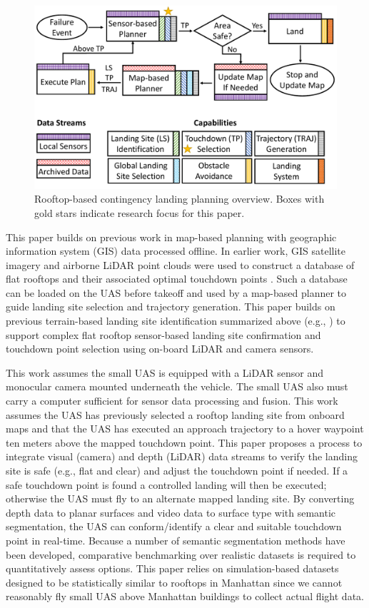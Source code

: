 \begin{figure}[ht!]
\centering
\includegraphics[width=.75\linewidth]{chapter_6_landingsim/figs/problem_statement_overview_2.pdf}
\caption[Rooftop-based contingency landing planning overview]{Rooftop-based contingency landing planning overview. Boxes with gold stars indicate research focus for this paper. }
\label{fig:ch6_contingency_planning}
\end{figure}

This paper builds on previous work in map-based planning with geographic information system (GIS) data processed offline. In earlier work, GIS satellite imagery and airborne LiDAR point clouds were used to construct a database of flat rooftops and their associated optimal touchdown points  \cite{castagno_map-based_2021}. Such a database can be loaded on the UAS before takeoff and used by a map-based planner to guide landing site selection and trajectory generation. This paper builds on previous terrain-based landing site identification summarized above (e.g., \cite{scherer_autonomous_2012}) to support complex flat rooftop sensor-based landing site confirmation and touchdown point selection using on-board LiDAR and camera sensors.

This work assumes the small UAS is equipped with a LiDAR sensor and monocular camera mounted underneath the vehicle. The small UAS also must carry a computer sufficient for sensor data processing and fusion. This work assumes the UAS has previously selected a rooftop landing site from onboard maps and that the UAS has executed an approach trajectory to a hover waypoint ten meters above the mapped touchdown point. This paper proposes a process to integrate visual (camera) and depth (LiDAR) data streams to verify the landing site is safe (e.g., flat and clear) and adjust the touchdown point if needed. If a safe touchdown point is found a controlled landing will then be executed; otherwise the UAS must fly to an alternate mapped landing site.  By converting depth data to planar surfaces and video data to surface type with semantic segmentation, the UAS can conform/identify a clear and suitable touchdown point in real-time. Because a number of semantic segmentation methods have been developed, comparative benchmarking over realistic datasets is required to quantitatively assess options.  This paper relies on simulation-based datasets designed to be statistically similar to rooftops in Manhattan since we cannot reasonably fly small UAS above Manhattan buildings to collect actual flight data.

